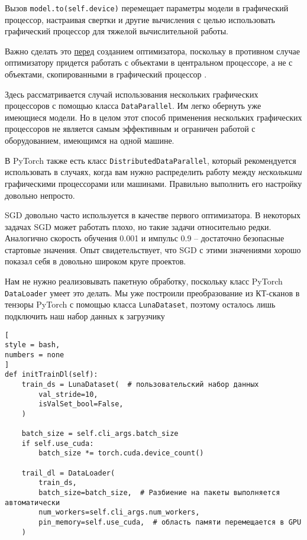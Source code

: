 \documentclass[%
	11pt,
	a4paper,
	utf8,
		]{article}
\begin{document}
Вызов \verb|model.to(self.device)| перемещает параметры модели в графический процессор, настраивая свертки и другие вычисления с целью использовать графический процессор для тяжелой вычислительной работы.

Важно сделать это \underline{перед} созданием оптимизатора, поскольку в противном случае оптимизатору придется работать с объектами в центральном процессоре, а не с объектами, скопированными в графический процессор \cite[]{pytorch-2022}.

Здесь рассматривается случай использования нескольких графических процессоров с помощью класса \verb|DataParallel|. Им легко обернуть уже имеющиеся модели. Но в целом этот способ применения нескольких графических процессоров не является самым эффективным и ограничен работой с оборудованием, имеющимся на одной машине.

В PyTorch также есть класс \verb|DistributedDataParallel|, который рекомендуется использовать в случаях, когда вам нужно распределить работу между \emph{несколькими} графическими процессорами или машинами. Правильно выполнить его настройку довольно непросто.

SGD довольно часто используется в качестве первого оптимизатора. В некоторых задачах SGD может работать плохо, но такие задачи относительно редки. Аналогично скорость обучения 0.001 и импульс 0.9 -- достаточно безопасные стартовые значения. Опыт свидетельствует, что SGD с этими значениями хорошо показал себя в довольно широком круге проектов.

Нам не нужно реализовывать пакетную обработку, поскольку класс PyTorch \verb|DataLoader| умеет это делать. Мы уже построили преобразование из КТ-сканов в тензоры PyTorch с помощью класса \verb|LunaDataset|, поэтому осталось лишь подключить наш набор данных к загрузчику
\begin{lstlisting}[
style = bash,
numbers = none
]
def initTrainDl(self):
    train_ds = LunaDataset(  # пользовательский набор данных
        val_stride=10,
        isValSet_bool=False,
    )
    
    batch_size = self.cli_args.batch_size
    if self.use_cuda:
        batch_size *= torch.cuda.device_count()
        
    trail_dl = DataLoader(
        train_ds,
        batch_size=batch_size,  # Разбиение на пакеты выполняется автоматически
        num_workers=self.cli_args.num_workers,
        pin_memory=self.use_cuda,  # область памяти перемещается в GPU
    )
\end{lstlisting}
\end{document}
